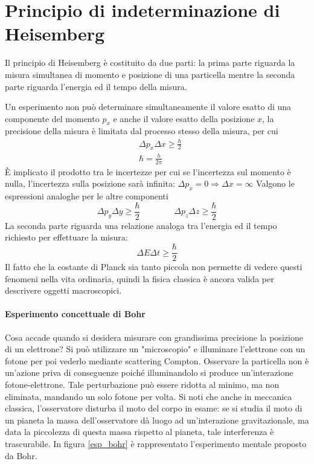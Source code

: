 

\section{Principio di indeterminazione di Heisemberg}
Il principio di Heisemberg è costituito da due parti: la prima parte riguarda la misura simultanea di momento e posizione di una particella mentre la seconda parte riguarda l'energia ed il tempo della misura.

Un esperimento non può determinare simultaneamente il valore esatto di una componente del momento $p_x$ e anche il valore esatto della posizione $x$, la precisione della misura è limitata dal processo stesso della misura, per cui
\begin{equation}
\begin{split}
& \Delta p_x \Delta x \ge \frac{ \hbar}{2 } \\
& \hbar = \frac{ h}{2\pi }
\end{split}
\end{equation}
È implicato il prodotto tra le incertezze per cui se l'incertezza sul momento è nulla, l'incertezza sulla posizione sarà infinita: $\Delta p_x = 0 \Rightarrow \Delta x = \infty$
Valgono le espressioni analoghe per le altre componenti
\begin{equation}
\Delta p_y \Delta y \ge \frac{ \hbar}{2 }
\quad\quad\quad\quad
\Delta p_z \Delta z \ge \frac{ \hbar}{2 }
\end{equation}
La seconda parte riguarda una relazione analoga tra l'energia ed il tempo richiesto per effettuare la misura:
\begin{equation}
\Delta E \Delta t \ge \frac{\hbar}{2}
\end{equation}
Il fatto che la costante di Planck sia tanto piccola non permette di vedere questi fenomeni nella vita ordinaria, quindi la fisica classica è ancora valida per descrivere oggetti macroscopici.


\paragraph{Esperimento concettuale di Bohr}
Cosa accade quando si desidera misurare con grandissima precisione la posizione di un elettrone?
Si può utilizzare un "microscopio" e illuminare l'elettrone con un fotone per poi vederlo mediante scattering Compton.
Osservare la particella non è un'azione priva di conseguenze poiché illuminandolo si produce un'interazione fotone-elettrone.
Tale perturbazione può essere ridotta al minimo, ma non eliminata, mandando un solo fotone per volta.
Si noti che anche in meccanica classica, l'osservatore disturba il moto del corpo in esame: se si studia il moto di un pianeta la massa dell'osservatore dà luogo ad un'interazione gravitazionale, ma data la piccolezza di questa massa rispetto al pianeta, tale interferenza è trascurabile.
In figura \ref{esp_bohr} è rappresentato l'esperimento mentale proposto da Bohr.

